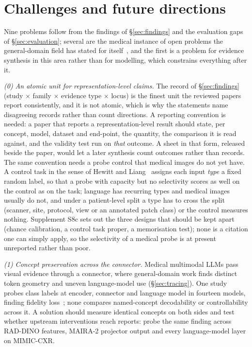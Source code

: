 \section{Challenges and future directions}
\label{sec:future}



Nine problems follow from the findings of \S\ref{sec:findings} and the evaluation gaps of
\S\ref{sec:evaluation}; several are the medical instance of open problems the general-domain field has
stated for itself~\cite{sharkey2025open}, and the first is a problem for evidence synthesis in this area
rather than for modelling, which constrains everything after it.

\textit{(0) An atomic unit for representation-level claims.} The record of \S\ref{sec:findings} (study
$\times$ family $\times$ evidence type $\times$ locus) is the finest unit the reviewed papers report
consistently, and it is not atomic, which is why the statements name disagreeing records rather than
count directions. A reporting convention is needed: a paper that reports a representation-level result should state, per concept,
model, dataset and end-point, the quantity, the comparison it is read against, and the validity test run on
\emph{that} outcome. A sheet in that form, released beside the paper, would let a later synthesis count
outcomes rather than records. The same convention needs a probe control that medical images do not yet
have. A control task in the sense of Hewitt and Liang~\cite{hewitt2019designing} assigns each input
\emph{type} a fixed random label, so that a probe with capacity but no selectivity scores as well on the
control as on the task; language has recurring types and medical images usually do not, and under a
patient-level split a type has to cross the split (scanner, site, protocol, view or an annotated patch class) or the control measures nothing. Supplement S8c sets out the three designs that should be kept
apart (chance calibration, a control task proper, a memorisation test); none is a citation one can simply
apply, so the selectivity of a medical probe is at present unreported rather than poor.

\textit{(1) Concept preservation across the connector.} Medical multimodal LLMs pass visual evidence through a
connector, where general-domain work finds distinct token geometry and uneven language-model use
(\S\ref{sec:tracing}). One study probes class labels at encoder, connector and language model in fourteen
models, finding fidelity loss~\cite{zhu2026lost}; none compares named-concept decodability or
controllability across it. A solution should measure identical concepts on both sides and test whether
upstream interventions reach reports: probe the same finding across RAD-DINO features, MAIRA-2
projector output and every language-model layer on MIMIC-CXR.

